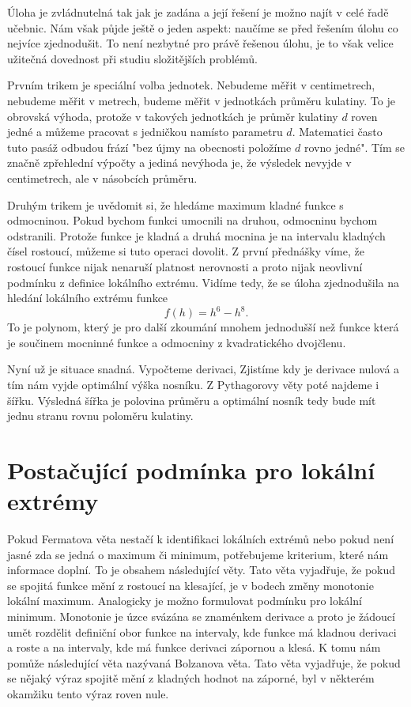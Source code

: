 \documentclass[12pt]{article}
\begin{document}
Úloha je zvládnutelná tak jak je zadána a její řešení je možno najít v celé řadě učebnic. Nám však půjde ještě o jeden aspekt: naučíme se před řešením úlohu co nejvíce zjednodušit. To není nezbytné pro právě řešenou úlohu, je to však velice užitečná dovednost při studiu složitějších problémů.

Prvním trikem je speciální volba jednotek. Nebudeme měřit v centimetrech, nebudeme měřit v metrech, budeme měřit v jednotkách průměru kulatiny. To je obrovská výhoda, protože v takových jednotkách je průměr kulatiny $d$ roven jedné a můžeme pracovat s jedničkou namísto parametru $d$. Matematici často tuto pasáž odbudou frází "bez újmy na obecnosti položíme $d$ rovno jedné". Tím se značně zpřehlední výpočty a jediná nevýhoda je, že výsledek nevyjde v centimetrech, ale v násobcích průměru.

Druhým trikem je uvědomit si, že hledáme maximum kladné funkce s odmocninou. Pokud bychom funkci umocnili na druhou, odmocninu bychom odstranili. Protože funkce je kladná a druhá mocnina je na intervalu kladných čísel rostoucí, můžeme si tuto operaci dovolit. Z první přednášky víme, že rostoucí funkce nijak nenaruší platnost nerovnosti a proto nijak neovlivní podmínku z definice lokálního extrému. Vidíme tedy, že se úloha zjednodušila na hledání lokálního extrému funkce $$f(h)=h^6-h^8.$$ To je polynom, který je pro další zkoumání mnohem jednodušší než funkce která je součinem mocninné funkce a odmocniny z kvadratického dvojčlenu.

Nyní už je situace snadná. Vypočteme derivaci, Zjistíme kdy je derivace nulová a tím nám vyjde optimální výška nosníku. Z Pythagorovy věty poté najdeme i šířku. Výsledná šířka je polovina průměru a optimální nosník tedy bude mít jednu stranu rovnu poloměru kulatiny. 


\section*{Postačující podmínka pro lokální extrémy}

Pokud Fermatova věta nestačí k identifikaci lokálních extrémů nebo pokud není jasné zda se jedná o maximum či minimum, potřebujeme kriterium, které nám informace doplní. To je obsahem následující věty. Tato věta vyjadřuje, že pokud se spojitá funkce mění z rostoucí na klesající, je v bodech změny monotonie lokální maximum. Analogicky je možno formulovat podmínku pro lokální minimum. Monotonie je úzce svázána se znaménkem derivace a proto je žádoucí umět rozdělit definiční obor funkce na intervaly, kde funkce má kladnou derivaci a roste a na intervaly, kde má funkce derivaci zápornou a klesá. K tomu nám pomůže následující věta nazývaná Bolzanova věta. Tato věta vyjadřuje, že pokud se nějaký výraz spojitě mění z kladných hodnot na záporné, byl v některém okamžiku tento výraz roven nule.
\end{document}
